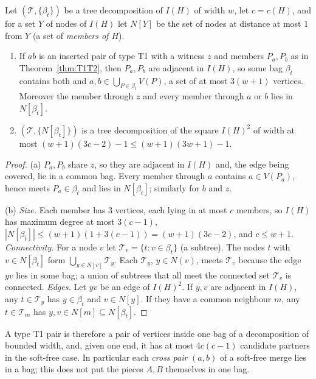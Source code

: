\begin{proposition}\label{prop:bag}
Let $(\mathcal T,\{\beta_t\})$ be a tree decomposition of $I(H)$ of width $w$, let $c=c(H)$, and for a set $Y$ of nodes of $I(H)$ let $N[Y]$ be the set of nodes at distance at most $1$ from $Y$ (a set of \emph{members of $H$}).
\begin{enumerate}
\item[(a)] If $ab$ is an inserted pair of type T1 with a witness $z$ and members $P_a,P_b$ as in Theorem~\ref{thm:T1T2}, then $P_a,P_b$ are adjacent in $I(H)$, so some bag $\beta_t$ contains both and $a,b\in\bigcup_{P\in\beta_t}V(P)$, a set of at most $3(w+1)$ vertices. Moreover the member through $z$ and every member through $a$ or $b$ lies in $N[\beta_t]$.
\item[(b)] $(\mathcal T,\{N[\beta_t]\})$ is a tree decomposition of the square $I(H)^2$ of width at most $(w+1)(3c-2)-1\le(w+1)(3w+1)-1$.
\end{enumerate}
\end{proposition}
\begin{proof}
(a) $P_a,P_b$ share $z$, so they are adjacent in $I(H)$ and, the edge being covered, lie in a common bag. Every member through $a$ contains $a\in V(P_a)$, hence meets $P_a\in\beta_t$ and lies in $N[\beta_t]$; similarly for $b$ and $z$.

(b) \emph{Size.} Each member has $3$ vertices, each lying in at most $c$ members, so $I(H)$ has maximum degree at most $3(c-1)$, $|N[\beta_t]|\le(w+1)(1+3(c-1))=(w+1)(3c-2)$, and $c\le w+1$. \emph{Connectivity.} For a node $v$ let $\mathcal T_v=\{t:v\in\beta_t\}$ (a subtree). The nodes $t$ with $v\in N[\beta_t]$ form $\bigcup_{y\in N[v]}\mathcal T_y$. Each $\mathcal T_y$, $y\in N(v)$, meets $\mathcal T_v$ because the edge $yv$ lies in some bag; a union of subtrees that all meet the connected set $\mathcal T_v$ is connected. \emph{Edges.} Let $yv$ be an edge of $I(H)^2$. If $y,v$ are adjacent in $I(H)$, any $t\in\mathcal T_y$ has $y\in\beta_t$ and $v\in N[y]$. If they have a common neighbour $m$, any $t\in\mathcal T_m$ has $y,v\in N[m]\subseteq N[\beta_t]$.
\end{proof}
A type T1 pair is therefore a pair of vertices inside one bag of a decomposition of bounded width, and, given one end, it has at most $4c(c-1)$ candidate partners in the soft-free case. In particular each \emph{cross pair} $(a,b)$ of a soft-free merge lies in a bag; this does not put the pieces $A,B$ themselves in one bag.

